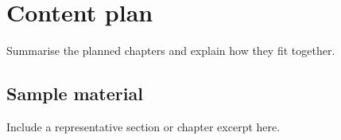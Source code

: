 \chapter{Content plan}
Summarise the planned chapters and explain how they fit together.
\section{Sample material}
Include a representative section or chapter excerpt here.
